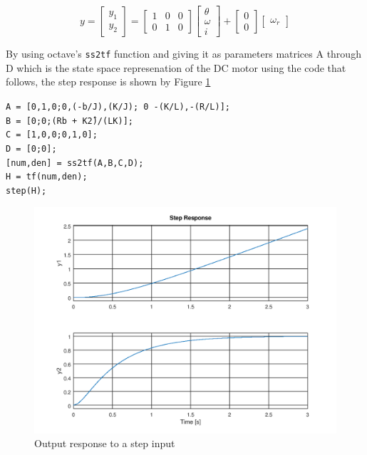 \documentclass[a4paper, 12pt]{article}
\begin{document}
\begin{equation}
  y =
  \left[
  \begin{array}{rcl}
	  y_1 \\
	  y_2
  \end{array}
  \right]
  =
  \left[
  \begin{array}{ccc}
    1 & 0 & 0 \\
    0 & 1 & 0
  \end{array}
  \right]
  \left[
  \begin{array}{c}
    \theta \\
    \omega \\
    i
  \end{array}
  \right]
  +
  \left[
  \begin{array}{c}
    0 \\
    0
  \end{array}
  \right]
  \left[
  \begin{array}{c}
    \omega_r
  \end{array}
  \right]
  \label{eq:ss_position_eq2}
\end{equation}

By using octave's \texttt{ss2tf} function and giving it as parameters matrices A through D which is the state space represenation of the DC motor using the code that follows, the step response is shown by Figure \ref{fig:question_2_output_response}\par

\noindent
\texttt{A = [0,1,0;0,(-b/J),(K/J); 0 -(K/L),-(R/L)];}\\
\texttt{B = [0;0;(R\*b + K\^2)/(L\*K)];}\\
\texttt{C = [1,0,0;0,1,0];}\\
\texttt{D = [0;0];}\\
\texttt{[num,den] = ss2tf(A,B,C,D);}\\
\texttt{H = tf(num,den);}\\
\texttt{step(H);}\\

\begin{figure}[H]
	\centering
	\includegraphics[width=\textwidth]{Images/question_2_output_response.png}
	\caption{Output response to a step input}
	\label{fig:question_2_output_response}
\end{figure}
\end{document}
